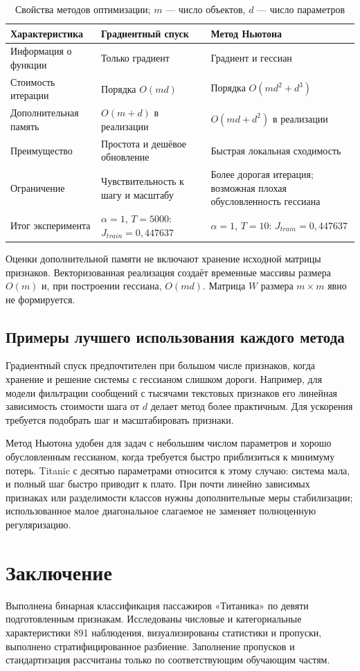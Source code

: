 \begin{table}[H]
\centering\small
\caption{Свойства методов оптимизации; $m$ — число объектов, $d$ — число параметров}
\begin{tabularx}{\textwidth}{lXX}
\toprule Характеристика & Градиентный спуск & Метод Ньютона \\ \midrule
Информация о функции & Только градиент & Градиент и гессиан \\
Стоимость итерации & Порядка $O(md)$ & Порядка $O(md^2+d^3)$ \\
Дополнительная память & $O(m+d)$ в реализации & $O(md+d^2)$ в реализации \\
Преимущество & Простота и дешёвое обновление & Быстрая локальная сходимость \\
Ограничение & Чувствительность к шагу и масштабу & Более дорогая итерация; возможная плохая обусловленность гессиана \\
Итог эксперимента & $\alpha=1$, $T=5000$: $J_{train}=0{,}447637$ & $\alpha=1$, $T=10$: $J_{train}=0{,}447637$ \\
\bottomrule
\end{tabularx}
\end{table}
Оценки дополнительной памяти не включают хранение исходной матрицы признаков. Векторизованная реализация создаёт временные массивы размера $O(m)$ и, при построении гессиана, $O(md)$. Матрица $W$ размера $m\times m$ явно не формируется.

\subsection{Примеры лучшего использования каждого метода}
Градиентный спуск предпочтителен при большом числе признаков, когда хранение и решение системы с гессианом слишком дороги. Например, для модели фильтрации сообщений с тысячами текстовых признаков его линейная зависимость стоимости шага от $d$ делает метод более практичным. Для ускорения требуется подобрать шаг и масштабировать признаки.

Метод Ньютона удобен для задач с небольшим числом параметров и хорошо обусловленным гессианом, когда требуется быстро приблизиться к минимуму потерь. Titanic с десятью параметрами относится к этому случаю: система мала, и полный шаг быстро приводит к плато. При почти линейно зависимых признаках или разделимости классов нужны дополнительные меры стабилизации; использованное малое диагональное слагаемое не заменяет полноценную регуляризацию.

\section{Заключение}
Выполнена бинарная классификация пассажиров «Титаника» по девяти подготовленным признакам. Исследованы числовые и категориальные характеристики 891 наблюдения, визуализированы статистики и пропуски, выполнено стратифицированное разбиение. Заполнение пропусков и стандартизация рассчитаны только по соответствующим обучающим частям.

